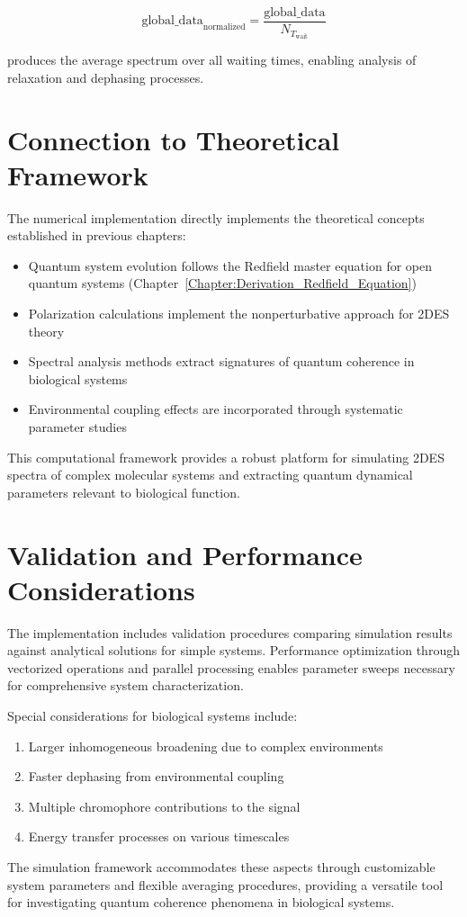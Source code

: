 \begin{equation}
    \label{eq:global_normalization}
    \text{global\_data}_{\text{normalized}} = \frac{\text{global\_data}}{N_{T_{\text{wait}}}}
\end{equation}

\noindent
produces the average spectrum over all waiting times, enabling analysis of relaxation and dephasing processes.

\section{Connection to Theoretical Framework}
\label{sec:connection_to_theory}

\noindent
The numerical implementation directly implements the theoretical concepts established in previous chapters:

\begin{itemize}
    \item Quantum system evolution follows the Redfield master equation for open quantum systems (Chapter~\ref{Chapter:Derivation_Redfield_Equation})
    \item Polarization calculations implement the nonperturbative approach for 2DES theory
    \item Spectral analysis methods extract signatures of quantum coherence in biological systems
    \item Environmental coupling effects are incorporated through systematic parameter studies
\end{itemize}

\noindent
This computational framework provides a robust platform for simulating 2DES spectra of complex molecular systems and extracting quantum dynamical parameters relevant to biological function.

\section{Validation and Performance Considerations}
\label{sec:validation_performance}

\noindent
The implementation includes validation procedures comparing simulation results against analytical solutions for simple systems. Performance optimization through vectorized operations and parallel processing enables parameter sweeps necessary for comprehensive system characterization.

\noindent
Special considerations for biological systems include:

\begin{enumerate}
    \item Larger inhomogeneous broadening due to complex environments
    \item Faster dephasing from environmental coupling
    \item Multiple chromophore contributions to the signal
    \item Energy transfer processes on various timescales
\end{enumerate}

\noindent
The simulation framework accommodates these aspects through customizable system parameters and flexible averaging procedures, providing a versatile tool for investigating quantum coherence phenomena in biological systems.